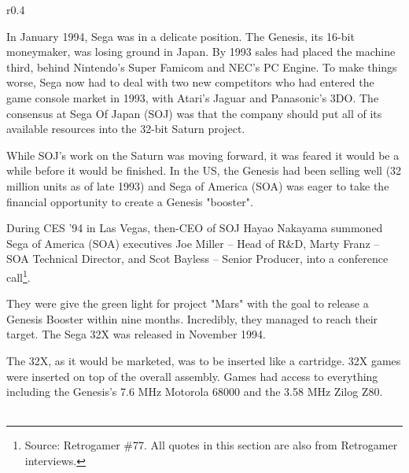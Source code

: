 \begin{wrapfigure}[4]{r}{0.4\textwidth}{
\centering {}}
\end{wrapfigure}
In January 1994, Sega was in a delicate position. The Genesis, its 16-bit moneymaker, was losing ground in Japan. By 1993 sales had placed the machine third, behind Nintendo's Super Famicom and NEC's PC Engine. To make things worse, Sega now had to deal with two new competitors who had entered the game console market in 1993, with Atari's Jaguar and Panasonic's 3DO. The consensus at Sega Of Japan (SOJ) was that the company should put all of its available resources into the 32-bit Saturn project.\\
\par
While SOJ's work on the Saturn was moving forward, it was feared it would be a while before it would be finished. In the US, the Genesis had been selling well (32 million units as of late 1993) and Sega of America (SOA) was eager to take the financial opportunity to create a Genesis "booster".\\
\par
During CES '94 in Las Vegas, then-CEO of SOJ Hayao Nakayama summoned Sega of America (SOA) executives Joe Miller -- Head of R\&D, Marty Franz -- SOA Technical Director, and Scot Bayless -- Senior Producer, into a conference call\footnote{Source: Retrogamer \#77. All quotes in this section are also from Retrogamer interviews.}.\\
\par 
They were give the green light for project "Mars" with the goal to release a Genesis Booster within nine months. Incredibly, they managed to reach their target. The Sega 32X was released in November 1994.\\
\par
{}%
\par
The 32X, as it would be marketed, was to be inserted like a cartridge. 32X games were inserted on top of the overall assembly. Games had access to everything including the Genesis's 7.6 MHz Motorola 68000 and the 3.58 MHz Zilog Z80.\\

\\
\par

